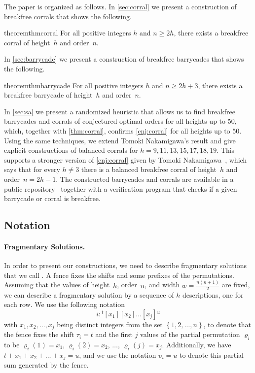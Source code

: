 \documentclass[runningheads,envcountsame]{llncs}
\newcommand{\set}[1]{\left\{ #1 \right\}}
\let\ge\geqslant
\let\rho\varrho
\begin{document}
The paper is organized as follows.
In \cref{sec:corral} we present a construction of breakfree corrals that shows the following.
\begin{restatable}{theorem}{thmcorral}\label{thm:corral}
    For all positive integers $h$ and $n\ge 2h$, there exists a breakfree corral of height~$h$ and order~$n$.
\end{restatable}
In \cref{sec:barrycade} we present a construction of breakfree barrycades that shows the following.
\begin{restatable}{theorem}{thmbarrycade}\label{thm:barrycade}
    For all positive integers $h$ and $n\ge 2h+3$, there exists a breakfree barrycade of height~$h$ and order~$n$.
\end{restatable}
In \cref{sec:sa} we present a randomized heuristic that allows us to find breakfree barrycades and corrals of conjectured optimal orders for all heights up to $50$, which, together with \cref{thm:corral}, confirms \cref{cnj:corral} for all heights up to $50$.
Using the same techniques, we extend Tomoki Nakamigawa's result and give explicit constructions of balanced corrals for $h=9,11,13,15,17,18,19$.
This supports a stronger version of \cref{cnj:corral} given by Tomoki Nakamigawa~\cite[Problem~2]{Nakamigawa2015}, which says that for every $h \neq 3$ there is a balanced breakfree corral of height~$h$ and order~$n=2h-1$.
The constructed barrycades and corrals are available in a public repository~\cite{repo} together with a verification program that checks if a given barrycade or corral is breakfree.

\subsection{Notation}\label{sec:notation}

\paragraph{Fragmentary Solutions.}
In order to present our constructions, we need to describe fragmentary solutions that we call .
A fence fixes the shifts and some prefixes of the permutations.
Assuming that the values of height~$h$, order~$n$, and width $w=\frac{n(n+1)}{2}$ are fixed, we can describe a fragmentary solution by a sequence of $h$ descriptions, one for each row.
We use the following notation
\begin{equation*}
    i:{}^t[x_1][x_2]\ldots[x_j]{}^u
\end{equation*}
with $x_1,x_2,\ldots,x_j$ being distinct integers from the set $\set{1,2,\ldots,n}$,
to denote that the fence fixes the shift $\tau_i=t$ and the first $j$ values of the partial permutation $\rho_i$ to be $\rho_i(1)=x_1$, $\rho_i(2)=x_2$, $\ldots$, $\rho_i(j)=x_j$.
Additionally, we have $t + x_1+x_2+\ldots+x_j=u$, and we use the notation $\upsilon_i = u$ to denote this partial sum generated by the fence.
\end{document}
